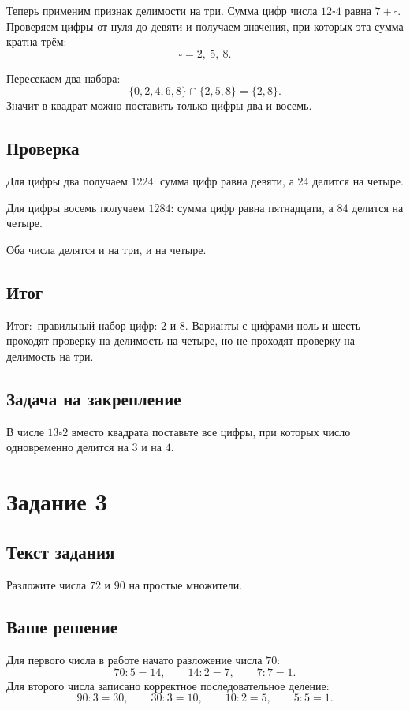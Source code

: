 \documentclass[12pt,a4paper]{article}
\newcommand{\Outcome}{\textcolor{teal!60!black}{Итог:}}
\begin{document}
Теперь применим признак делимости на три. Сумма цифр числа $12\square4$ равна $7+\square$. Проверяем цифры от нуля до девяти и получаем значения, при которых эта сумма кратна трём:
\[
\square=2,\ 5,\ 8.
\]

Пересекаем два набора:
\[
\{0,2,4,6,8\}\cap\{2,5,8\}=\{2,8\}.
\]
Значит в квадрат можно поставить только цифры два и восемь.

\subsection*{Проверка}
Для цифры два получаем $1224$: сумма цифр равна девяти, а $24$ делится на четыре.

Для цифры восемь получаем $1284$: сумма цифр равна пятнадцати, а $84$ делится на четыре.

Оба числа делятся и на три, и на четыре.

\subsection*{Итог}
\Outcome\ правильный набор цифр: $2$ и $8$. Варианты с цифрами ноль и шесть проходят проверку на делимость на четыре, но не проходят проверку на делимость на три.

\subsection*{Задача на закрепление}
В числе $13\square2$ вместо квадрата поставьте все цифры, при которых число одновременно делится на $3$ и на $4$.

\newpage
{}\label{task:3}
\section*{Задание 3}

\subsection*{Текст задания}
Разложите числа $72$ и $90$ на простые множители.

\subsection*{Ваше решение}
Для первого числа в работе начато разложение числа $70$:
\[
70:5=14,\qquad 14:2=7,\qquad 7:7=1.
\]
Для второго числа записано корректное последовательное деление:
\[
90:3=30,\qquad 30:3=10,\qquad 10:2=5,\qquad 5:5=1.
\]
\end{document}
